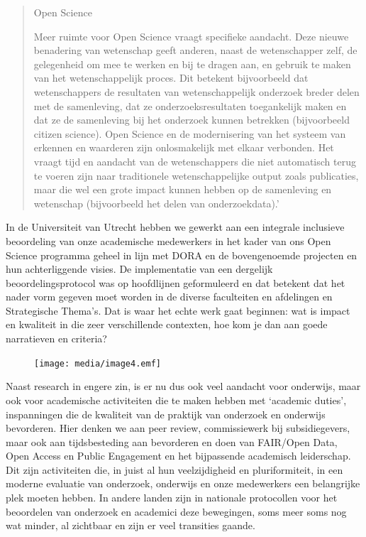 \documentclass[empirical, authordate, ]{new-jote-article}
\begin{document}
	\begin{quote}
		\itshape

		Open Science

		Meer ruimte voor Open Science vraagt specifieke aandacht. Deze nieuwe benadering van wetenschap geeft anderen, naast de wetenschapper zelf, de gelegenheid om mee te werken en bij te dragen aan, en gebruik te maken van het wetenschappelijk proces. Dit betekent bijvoorbeeld dat wetenschappers de resultaten van wetenschappelijk onderzoek breder delen met de samenleving, dat ze onderzoeksresultaten toegankelijk maken en dat ze de samenleving bij het onderzoek kunnen betrekken (bijvoorbeeld citizen science). Open Science en de modernisering van het systeem van erkennen en waarderen zijn onlosmakelijk met elkaar verbonden. Het vraagt tijd en aandacht van de wetenschappers die niet automatisch terug te voeren zijn naar traditionele wetenschappelijke output zoals publicaties, maar die wel een grote impact kunnen hebben op de samenleving en wetenschap (bijvoorbeeld het delen van onderzoekdata).'
	\end{quote}

	In de Universiteit van Utrecht hebben we gewerkt aan een integrale inclusieve beoordeling van onze academische medewerkers in het kader van ons Open Science programma geheel in lijn met DORA en de bovengenoemde projecten en hun achterliggende visies. De implementatie van een dergelijk beoordelingsprotocol was op hoofdlijnen geformuleerd en dat betekent dat het nader vorm gegeven moet worden in de diverse faculteiten en afdelingen en Strategische Thema's. Dat is waar het echte werk gaat beginnen: wat is impact en kwaliteit in die zeer verschillende contexten, hoe kom je dan aan goede narratieven en criteria?











	\begin{figure}
		\texttt{[image: media/image4.emf]}

		\caption{}

		\label{fig:rId19}


	\end{figure}



	Naast research in engere zin, is er nu dus ook veel aandacht voor onderwijs, maar ook voor academische activiteiten die te maken hebben met ‘academic duties', inspanningen die de kwaliteit van de praktijk van onderzoek en onderwijs bevorderen. Hier denken we aan peer review, commissiewerk bij subsidiegevers, maar ook aan tijdsbesteding aan bevorderen en doen van FAIR/Open Data, Open Access en Public Engagement en het bijpassende academisch leiderschap. Dit zijn activiteiten die, in juist al hun veelzijdigheid en pluriformiteit, in een moderne evaluatie van onderzoek, onderwijs en onze medewerkers een belangrijke plek moeten hebben. In andere landen zijn in nationale protocollen voor het beoordelen van onderzoek en academici deze bewegingen, soms meer soms nog wat minder, al zichtbaar en zijn er veel transities gaande.
\end{document}

